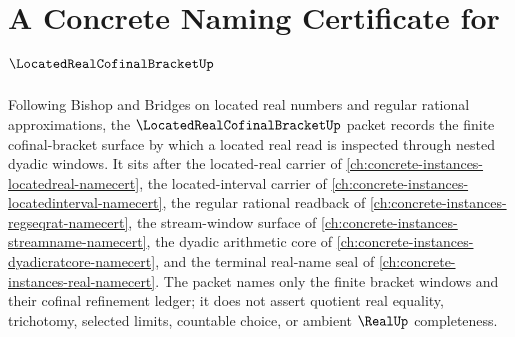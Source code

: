 \chapter{A Concrete Naming Certificate for $\LocatedRealCofinalBracketUp$}
\label{ch:concrete-instances-located-real-cofinal-bracket-namecert}

Following Bishop and Bridges on located real numbers and regular rational approximations, the $\LocatedRealCofinalBracketUp$ packet records the finite cofinal-bracket surface by which a located real read is inspected through nested dyadic windows. It sits after the located-real carrier of \autoref{ch:concrete-instances-locatedreal-namecert}, the located-interval carrier of \autoref{ch:concrete-instances-locatedinterval-namecert}, the regular rational readback of \autoref{ch:concrete-instances-regseqrat-namecert}, the stream-window surface of \autoref{ch:concrete-instances-streamname-namecert}, the dyadic arithmetic core of \autoref{ch:concrete-instances-dyadicratcore-namecert}, and the terminal real-name seal of \autoref{ch:concrete-instances-real-namecert}. The packet names only the finite bracket windows and their cofinal refinement ledger; it does not assert quotient real equality, trichotomy, selected limits, countable choice, or ambient $\RealUp$ completeness.

